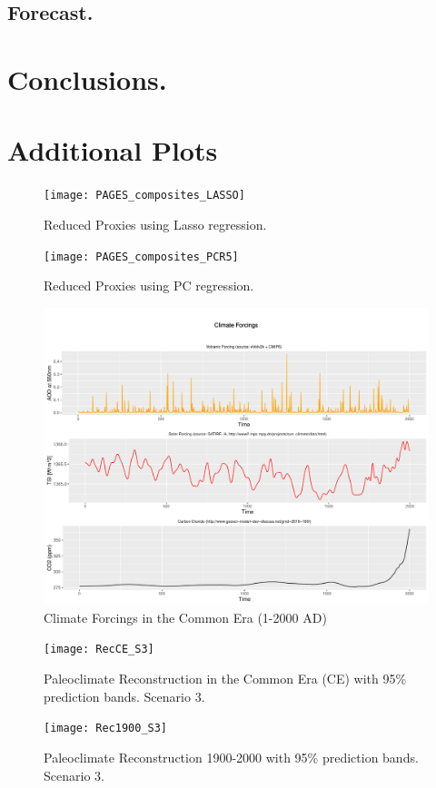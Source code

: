 \documentclass[11pt]{amsart}
\theoremstyle{plain}
\theoremstyle{definition}
\theoremstyle{remark}
\begin{document}
\subsection{Forecast.}
\label{sec:forec}


\section{Conclusions.}
\label{sec:conclusions}

\printbibliography

\newpage
\appendix

\section{Additional Plots}
\begin{figure}[H]
  \centering
 \texttt{[image: PAGES\_composites\_LASSO]} 
  \caption{Reduced Proxies using Lasso regression.}
  \label{fig:proxieslasso}
\end{figure}

\begin{figure}[H]
  \centering
  \texttt{[image: PAGES\_composites\_PCR5]} 
  \caption{Reduced Proxies using PC regression.}
  \label{fig:proxiespcr}
\end{figure}

\begin{figure}[H]
  \centering
  \includegraphics[scale=0.4]{forcings}
  \caption{Climate Forcings in the Common Era (1-2000 AD)}
  \label{fig:forcings}
\end{figure}

\begin{figure}[H]
  \centering
  \texttt{[image: RecCE\_S3]}
  \caption{Paleoclimate Reconstruction in the Common Era (CE) with 95\%
    prediction bands. Scenario 3.}
  \label{fig:paleoCE3}
\end{figure}

\begin{figure}[H]
  \centering
  \texttt{[image: Rec1900\_S3]}
  \caption{Paleoclimate Reconstruction 1900-2000 with 95\%
    prediction bands. Scenario 3.}
  \label{fig:paleo19003}
\end{figure}
\end{document}
